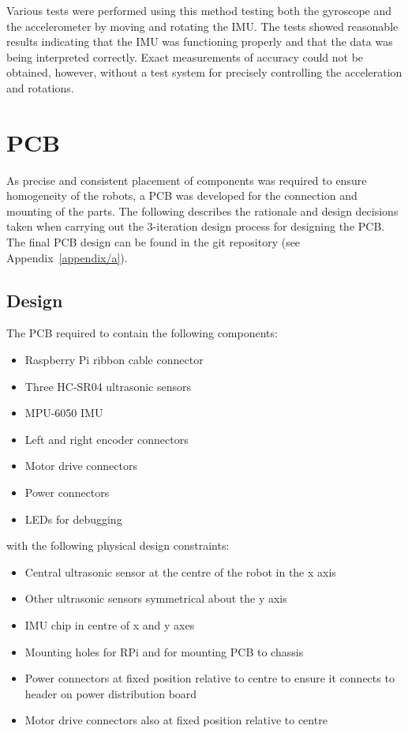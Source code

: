 Various tests were performed using this method testing both the gyroscope and the
accelerometer by moving and rotating the IMU. The tests showed reasonable results
indicating that the IMU was functioning properly and that the data was being interpreted
correctly. Exact measurements of accuracy could not be obtained, however, without a test
system for precisely controlling the acceleration and rotations.

\section{PCB}\label{elec/pcb}
As precise and consistent placement of components was required to ensure
homogeneity of the robots, a PCB was developed for the connection
and mounting of the parts. The following
describes the rationale and design decisions taken when carrying out the
3-iteration design process for designing the PCB. The final PCB design can
be found in the git repository (see Appendix~\ref{appendix/a}).

\subsection{Design}\label{elec/pcb/design}
The PCB required to contain the following components:
\begin{itemize}
  \item Raspberry Pi ribbon cable connector
  \item Three HC-SR04 ultrasonic sensors
  \item MPU-6050 IMU
  \item Left and right encoder connectors
  \item Motor drive connectors
  \item Power connectors
  \item LEDs for debugging
\end{itemize}

with the following physical design constraints:

\begin{itemize}
  \item Central ultrasonic sensor at the centre of the robot in the x axis
  \item Other ultrasonic sensors symmetrical about the y axis
  \item IMU chip in centre of x and y axes
  \item Mounting holes for RPi and for mounting PCB to chassis
  \item Power connectors at fixed position relative to centre to ensure it
  connects to header on power distribution board
  \item Motor drive connectors also at fixed position relative to centre
\end{itemize}

